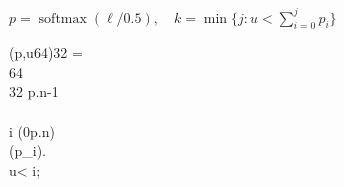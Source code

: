 \documentclass{article}
\begin{document}
\begin{preview}\begin{minipage}{19cm}
\small
$p=\operatorname{softmax}(\ell/0.5),\quad k=\min\{j:u<\sum_{i=0}^{j}p_i\}$
\begin{FortressCode}
(p\COLON{},u\COLON{}64)\COLON{}32 =\;  \\
\2\+\COLON{}64  \\
  \COLON{}32 \ASSIGN p.n-1 \\
  \COLON{} \ASSIGN {} \\
   i \leftarrow {}(0\mathbin{\#}p.n)  \\
  \2\+ \mathrel{\mathrel{+}=} (p_{i}). \\
    \; \neg {} \wedge u<   \ASSIGN i;  \ASSIGN {} \- \\
   \\
  \- \\
\end{FortressCode}
\end{minipage}\end{preview}
\end{document}
